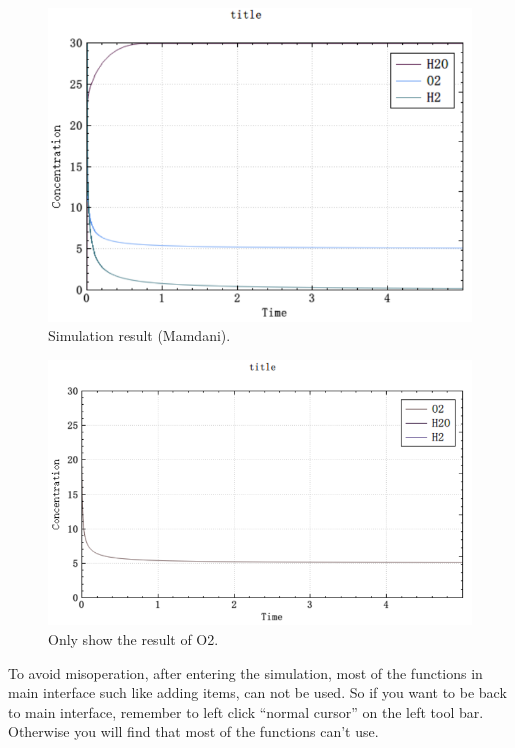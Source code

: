 \documentclass[journal,a4paper,onecolumn]{article}
\begin{document}
\begin{figure}[!hbt]
	\begin{center}
		\includegraphics[width=\columnwidth]{fig14}
		\caption{Simulation result (Mamdani).}
		\label{fig:Simulation result (Mamdani)}
	\end{center}
\end{figure}
\begin{figure}[!hbt]
	\begin{center}
		\includegraphics[width=\columnwidth]{fig18}
		\caption{Only show the result of O2.}
		\label{fig:Only show the result of O2}
	\end{center}
\end{figure}

To avoid misoperation, after entering the simulation, most of the functions in main interface such like adding items, can not be used. So if you want to be back to main interface, remember to left click ``normal cursor'' on the left tool bar. Otherwise you will find that most of the functions can't use.
\end{document}
